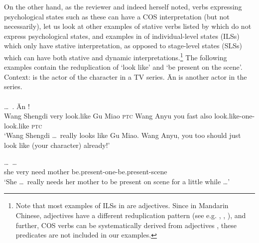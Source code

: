 On the other hand, as the reviewer %
and indeed \citet[669--670]{Tham2013} herself noted,
verbs expressing psychological states such as these can have a COS interpretation (but not necessarily),
let us look at other examples of stative verbs listed by \citet[680]{PeckEtAl2013} which do not express psychological states,
and examples in  \citet[Sec. 3.3.3]{XiaoMcEnery2004} of individual-level states (ILSs) which only have stative interpretation,
as opposed to stage-level states (SLSs) which can have both stative and dynamic interpretations.\footnote{
    Note that most examples of ILSs in \citet[Sec. 3.3.3]{XiaoMcEnery2004} are adjectives.
    Since in Mandarin Chinese, adjectives have a different reduplication pattern (see e.g. \citealt[Sec. 2.2]{Tsao2001}, \citealt[Sec. 4.1]{FanSongBond2015}, \citealt[Sec. 3]{Sui2018}),
    and further, COS verbs can be systematically derived from adjectives \citep[Sec. 3]{Tham2013},
    these predicates are not included in our examples.}
The following examples contain the reduplication of  `look like' and  `be present on the scene'.
\ea\label{ex:xiang}%
Context:   is the actor of the character   in a TV series.
 Ān is another actor in the series.\\
\\
\gll {}  \ldots\,     .  Ān     !\footnotemark\\
Wang Shengdi {} very look.like Gu Miao \textsc{ptc} Wang Anyu you fast also look.like-one-look.like \textsc{ptc}\\
\glt `Wang Shengdi \ldots\,  really looks like Gu Miao. Wang Anyu, you too should just look like (your character) already!'

\ex\label{ex:zaichang}%
 \ldots\,     \ldots\\
she {} very need mother be.present-one-be.present-scene\\
\glt `She \ldots\, really needs her mother to be present on scene for a little while \ldots'
\z
{}

